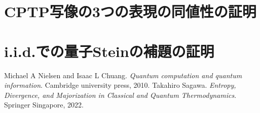 \documentclass[report]{jlreq}
\begin{document}
\appendix
\chapter{CPTP写像の3つの表現の同値性の証明}
\chapter{i.i.d.での量子Steinの補題の証明}
  
\begin{thebibliography}{99}
Michael A Nielsen and Isaac L Chuang. 
    \textit{Quantum computation and quantum information}.
    Cambridge university press, 2010.
Takahiro Sagawa. 
    \textit{Entropy, Divergence, and Majorization in Classical and Quantum Thermodynamics}. 
    Springer Singapore, 2022.
\end{thebibliography}
  
\end{document}
